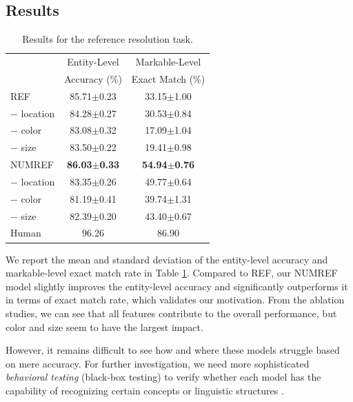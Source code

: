 \subsection{Results}
\label{05_subsec:reference_resolution_results}

\begin{table}[ht]
\centering \small
\setlength{\tabcolsep}{9pt}
\begin{tabular}{lcc}
\toprule
 & Entity-Level & Markable-Level \\
 & Accuracy (\%) & Exact Match (\%) \\
\midrule
REF & 85.71$\pm$0.23 & 33.15{\scriptsize $\pm$1.00} \\
\phantom{NN}$-$ location & 84.28{\scriptsize $\pm$0.27} & 30.53{\scriptsize $\pm$0.84} \\
\phantom{NN}$-$ color & 83.08{\scriptsize $\pm$0.32} & 17.09{\scriptsize $\pm$1.04} \\
\phantom{NN}$-$ size & 83.50{\scriptsize $\pm$0.22} & 19.41{\scriptsize $\pm$0.98} \\
\midrule
NUMREF & \textbf{86.03{\scriptsize $\pm$0.33}} & \textbf{54.94{\scriptsize $\pm$0.76}} \\
\phantom{NN}$-$ location & 83.35{\scriptsize $\pm$0.26} & 49.77{\scriptsize $\pm$0.64} \\
\phantom{NN}$-$ color & 81.19{\scriptsize $\pm$0.41} & 39.74{\scriptsize $\pm$1.31} \\
\phantom{NN}$-$ size & 82.39{\scriptsize $\pm$0.20} & 43.40{\scriptsize $\pm$0.67} \\
\midrule
Human & 96.26 & 86.90 \\
\bottomrule
\end{tabular}
\caption{
Results for the reference resolution task.
}
\label{05_tab:experiment_results}
\end{table}

We report the mean and standard deviation of the entity-level accuracy and markable-level exact match rate in Table \ref{05_tab:experiment_results}. Compared to REF, our NUMREF model slightly improves the entity-level accuracy and significantly outperforms it in terms of exact match rate, which validates our motivation. From the ablation studies, we can see that all features contribute to the overall performance, but color and size seem to have the largest impact. 

However, it remains difficult to see how and where these models struggle based on mere accuracy. For further investigation, we need more sophisticated \textit{behavioral testing} (black-box testing) to verify whether each model has the capability of recognizing certain concepts or linguistic structures \citep{ribeiro-etal-2020-beyond}.

